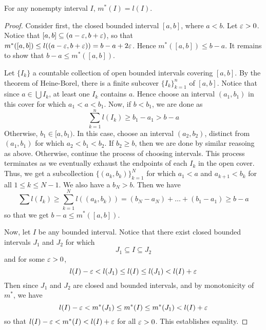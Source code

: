 \begin{lemma}\label{2.1.2}
    For any nonempty interval $I$,  $m^\ast(I)=l(I)$.
\end{lemma}
\begin{proof}
    Consider first, the closed bounded interval $[a,b]$, where $a<b$. Let
    $\varepsilon>0$. Notice that  $[a,b] \subseteq (a-\varepsilon,b+\varepsilon)$, so that $m^\ast([a,b])
    \leq l((a-\varepsilon,b+\varepsilon))=b-a+2\varepsilon$. Hence $m^\ast([a,b]) \leq b-a$. It remains to
    show that $b-a \leq m^\ast([a,b])$.

    Let $\{I_k\}$ a countable collection of open bounded intervals covering
    $[a,b]$. By the theorem of Heine-Borel, there is a finite subcover
    $\{I_k\}_{k=1}^n$  of $[a,b]$. Notice that since $a \in \bigcup{I_k}$, at least
    one $I_k$ contains $a$. Hence choose an interval $(a_1,b_1)$ in this cover
    for which $a_1<a<b_1$. Now, if $b<b_1$, we are done as
    \begin{equation*}
        \sum_{k=1}^n{l(I_k)} \geq b_1-a_1>b-a
    \end{equation*}
    Otherwise, $b_1 \in [a,b_1)$. In this case, choose an interval $(a_2,b_2)$,
    distinct from $(a_1,b_1)$ for which $a_2<b_1<b_2$. If $b_2 \geq b$, then we
    are done by similar reasoing as above. Otherwise, continue the process of
    choosing intervals. This process terminates as we eventually exhaust the
    endpoints of each $I_k$ in the open cover. Thus, we get a subcollection
    $\{(a_k,b_k)\}_{k=1}^N$ for which $a_1<a$ and $a_{k+1}<b_k$ for all $1 \leq
    k \leq N-1$. We also have a  $b_N>b$. Then we have
    \begin{equation*}
        \sum{l(I_k)} \geq \sum_{k=1}^N{l((a_k,b_k))}=(b_N-a_N)+\dots+(b_1-a_1)
        \geq b-a
    \end{equation*}
    so that we get $b-a \leq m^\ast([a,b])$.

    Now, let $I$ be any bounded interval. Notice that there exist closed bounded
    intervals  $J_1$ and $J_2$ for which
    \begin{equation*}
        J_1 \subseteq I \subseteq J_2
    \end{equation*}
    and for some $\varepsilon>0$,
    \begin{equation*}
        l(I)-\varepsilon<l(J_1) \leq l(I) \leq l(J_1)<l(I)+\varepsilon
    \end{equation*}
    Then since $J_1$ and $J_2$ are closed and bounded intervals, and by
    monotonicity of $m^\ast$, we have
    \begin{equation*}
        l(I)-\varepsilon<m^\ast(J_1) \leq m^\ast(I) \leq m^\ast(J_1)<l(I)+\varepsilon
    \end{equation*}
    so that $l(I)-\varepsilon<m^\ast(I)<l(I)+\varepsilon$ for all $\varepsilon>0$. This establishes
    equality.
\end{proof}

